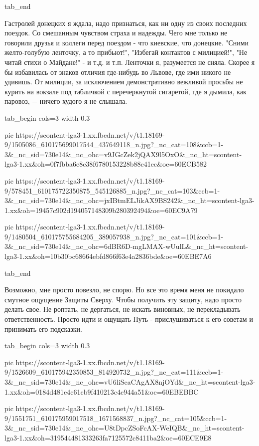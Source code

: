   tab_end
\fi

Гастролей донецких я ждала, надо признаться, как ни одну из своих последних
поездок. Со смешанным чувством страха и надежды. Чего мне только не говорили
друзья и коллеги перед поездом - что киевские, что донецкие. "Сними
желто-голубую ленточку, а то прибьют!", "Избегай контактов с милицией!", "Не
читай стихи о Майдане!" - и т.д. и т.п. Ленточки я, разумеется не сняла. Скорее
я бы избавилась от знаков отличия где-нибудь во Львове, где ими никого не
удивишь. От милиции, за исключением демонстративно вежливой просьбы не курить
на вокзале под табличкой с перечеркнутой сигаретой, где я дымила, как паровоз,
− ничего худого я не слышала. 


\ifcmt
  tab_begin cols=3
  width 0.3

     pic https://scontent-lga3-1.xx.fbcdn.net/v/t1.18169-9/1505086_610175699017544_437649118_n.jpg?_nc_cat=108&ccb=1-3&_nc_sid=730e14&_nc_ohc=v9JGcZek2jQAX9l5OxO&_nc_ht=scontent-lga3-1.xx&oh=0f7fbba6e8c38f6780153228b88e41ec&oe=60ECB582

     pic https://scontent-lga3-1.xx.fbcdn.net/v/t1.18169-9/578451_610175722350875_545126885_n.jpg?_nc_cat=103&ccb=1-3&_nc_sid=730e14&_nc_ohc=jxIBtmELJikAX9BS242&_nc_ht=scontent-lga3-1.xx&oh=19457c902d194057148309b280392494&oe=60EC9A79

     pic https://scontent-lga3-1.xx.fbcdn.net/v/t1.18169-9/1480504_610175755684205_389057938_n.jpg?_nc_cat=101&ccb=1-3&_nc_sid=730e14&_nc_ohc=6dBR6D-mgLMAX-wUulL&_nc_ht=scontent-lga3-1.xx&oh=10b30bc68664ebfd866f63e4a2836bde&oe=60EBE7A6

  tab_end
\fi


Возможно, мне просто повезло, не спорю. Но все это время меня не покидало
смутное ощущение  Защиты Сверху. Чтобы получить эту защиту, надо просто  делать
свое. Не роптать, не дергаться, не искать виновных, не перекладывать
ответственность.  Просто идти и ощущать Путь - прислушиваться к его советам и
принимать его подсказки. 

\ifcmt
  tab_begin cols=3
  width 0.3

     pic https://scontent-lga3-1.xx.fbcdn.net/v/t1.18169-9/1526609_610175942350853_814920732_n.jpg?_nc_cat=111&ccb=1-3&_nc_sid=730e14&_nc_ohc=vU6liScaCAgAX8njOYd&_nc_ht=scontent-lga3-1.xx&oh=0184d481e4c61cb9f410213c4c944a51&oe=60EBEBBC

     pic https://scontent-lga3-1.xx.fbcdn.net/v/t1.18169-9/1551751_610175959017518_1671568837_n.jpg?_nc_cat=105&ccb=1-3&_nc_sid=730e14&_nc_ohc=U8tDpcZSoFcAX-WeIQB&_nc_ht=scontent-lga3-1.xx&oh=319544481333263fa7125572c8411ba2&oe=60ECE9E8

